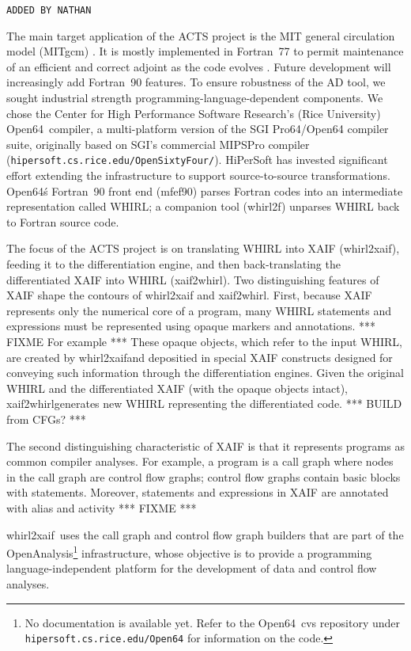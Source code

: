 \documentclass[acmtocl,acmnow]{acmtrans2m}
\newcommand{\OpenSixtyFour}{Open64}
\newcommand{\OpenAnalysis}{OpenAnalysis}
\newcommand{\whirlToxaif}{whirl2xaif}
\newcommand{\xaifTowhirl}{xaif2whirl}
\begin{document}
{\tt ADDED BY NATHAN }

The main target application of the ACTS project is the MIT general circulation
model (MITgcm) \cite{mars-eta:97b,mars-eta:97a}. 
It is mostly implemented in Fortran~77 to permit maintenance of an efficient
and correct adjoint as the code evolves \cite{HHG02}. Future development will
increasingly add Fortran~90 features. 
To ensure robustness of the AD tool, we sought industrial strength
programming-language-dependent components.  We chose the Center for High
Performance Software Research's (Rice University) \OpenSixtyFour\
compiler, a multi-platform version of the SGI Pro64/Open64 compiler
suite, originally based on SGI's commercial MIPSPro compiler 
({\tt hipersoft.cs.rice.edu/OpenSixtyFour/}).  HiPerSoft
has invested significant effort extending the infrastructure to
support source-to-source transformations.  \OpenSixtyFour\'s
Fortran~90 front end (mfef90) parses Fortran codes into an intermediate
representation called WHIRL; a companion tool (whirl2f) unparses WHIRL
back to Fortran source code.

The focus of the ACTS project is on translating WHIRL into XAIF
(\whirlToxaif), feeding it to the differentiation engine, and then
back-translating the differentiated XAIF into WHIRL (\xaifTowhirl).
Two distinguishing features of XAIF shape the contours of \whirlToxaif
and \xaifTowhirl.  First, because XAIF represents only the numerical
core of a program, many WHIRL statements and expressions must be
represented using opaque markers and annotations.  
*** FIXME For example *** 
These opaque objects, which refer to the input WHIRL, are created by
\whirlToxaif and depositied in special XAIF constructs designed for
conveying such information through the differentiation engines.  Given
the original WHIRL and the differentiated XAIF (with the opaque
objects intact), \xaifTowhirl generates new WHIRL representing the
differentiated code. *** BUILD from CFGs? ***

The second distinguishing characteristic of XAIF is that it represents
programs as common compiler analyses.  For example, a program is a
call graph where nodes in the call graph are control flow graphs;
control flow graphs contain basic blocks with statements.  Moreover,
statements and expressions in XAIF are annotated with alias and
activity  *** FIXME ***

 \whirlToxaif\ uses the call graph and control flow graph builders
that are part of the \OpenAnalysis\footnote{No documentation is
available yet.  Refer to the \OpenSixtyFour\ cvs repository under {\tt
hipersoft.cs.rice.edu/Open64} for information on the code.}
infrastructure, whose objective is to provide a programming
language-independent platform for the development of data and control
flow analyses.
\end{document}
